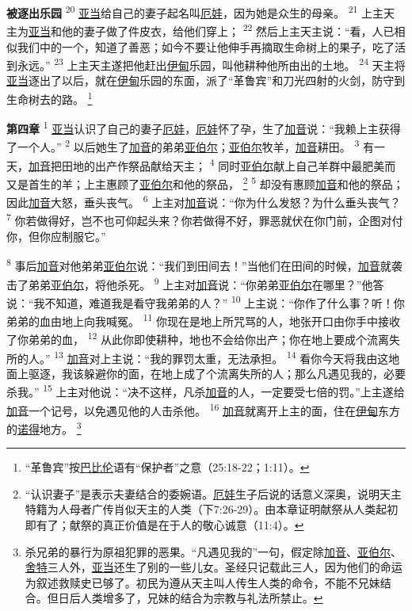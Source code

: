 \textbf{被逐出乐园\quad}
\textsuperscript{20}
\uline{亚当}给自己的妻子起名叫\uline{厄娃}，因为她是众生的母亲。
\textsuperscript{21}
上主天主为\uline{亚当}和他的妻子做了件皮衣，给他们穿上；
\textsuperscript{22}
然后上主天主说：“看，人已相似我们中的一个，知道了善恶；如今不要让他伸手再摘取生命树上的果子，吃了活到永远。”
\textsuperscript{23}
上主天主遂把他赶出\uline{伊甸}乐园，叫他耕种他所由出的土地。
\textsuperscript{24}
天主将\uline{亚当}逐出了以后，就在\uline{伊甸}乐园的东面，派了“革鲁宾”和刀光四射的火剑，防守到生命树去的路。
\footnote{“革鲁宾”按\uline{巴比伦}语有“保护者”之意（25:18-22；1:11）。}

\textbf{第四章\quad}
\textsuperscript{1}
\uline{亚当}认识了自己的妻子\uline{厄娃}，\uline{厄娃}怀了孕，生了\uline{加音}说：“我赖上主获得了一个人。”
\textsuperscript{2}
以后她生了\uline{加音}的弟弟\uline{亚伯尔}；\uline{亚伯尔}牧羊，\uline{加音}耕田。
\textsuperscript{3}
有一天，\uline{加音}把田地的出产作祭品献给天主；
\textsuperscript{4}
同时\uline{亚伯尔}献上自己羊群中最肥美而又是首生的羊；上主惠顾了\uline{亚伯尔}和他的祭品，
\footnote{“认识妻子”是表示夫妻结合的委婉语。\uline{厄娃}生子后说的话意义深奥，说明天主特籍为人母者广传肖似天主的人类（下7:26-29）。由本章证明献祭从人类起初即有了；献祭的真正价值是在于人的敬心诚意（11:4）。}
\textsuperscript{5}
却没有惠顾\uline{加音}和他的祭品；因此\uline{加音}大怒，垂头丧气。
\textsuperscript{6}
上主对\uline{加音}说：“你为什么发怒？为什么垂头丧气？
\textsuperscript{7}
你若做得好，岂不也可仰起头来？你若做得不好，罪恶就伏在你门前，企图对付你，但你应制服它。”

\textsuperscript{8}
事后\uline{加音}对他弟弟\uline{亚伯尔}说：“我们到田间去！”当他们在田间的时候，\uline{加音}就袭击了弟弟\uline{亚伯尔}，将他杀死。
\textsuperscript{9}
上主对\uline{加音}说：“你弟弟\uline{亚伯尔}在哪里？”他答说：“我不知道，难道我是看守我弟弟的人？”
\textsuperscript{10}
上主说：“你作了什么事？听！你弟弟的血由地上向我喊冤。
\textsuperscript{11}
你现在是地上所咒骂的人，地张开口由你手中接收了你弟弟的血，
\textsuperscript{12}
从此你即使耕种，地也不会给你出产；你在地上要成个流离失所的人。”
\textsuperscript{13}
\uline{加音}对上主说：“我的罪罚太重，无法承担。
\textsuperscript{14}
看你今天将我由这地面上驱逐，我该躲避你的面，在地上成了个流离失所的人；那么凡遇见我的，必要杀我。”
\textsuperscript{15}
上主对他说：“决不这样，凡杀\uline{加音}的人，一定要受七倍的罚。”上主遂给\uline{加音}一个记号，以免遇见他的人击杀他。
\textsuperscript{16}
\uline{加音}就离开上主的面，住在\uline{伊甸}东方的\uline{诺得}地方。
\footnote{杀兄弟的暴行为原祖犯罪的恶果。“凡遇见我的”一句，假定除\uline{加音}、\uline{亚伯尔}、\uline{舍特}三人外，\uline{亚当}还生了别的一些儿女。圣经只记载此三人，因为他们的命运为叙述救赎史已够了。初民为遵从天主叫人传生人类的命令，不能不兄妹结合。但日后人类增多了，兄妹的结合为宗教与礼法所禁止。}

